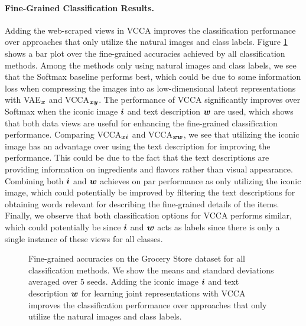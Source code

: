 \vspace{-3mm}
\paragraph{Fine-Grained Classification Results.} Adding the web-scraped views in VCCA improves the classification performance over approaches that only utilize the natural images and class labels. Figure \ref{fig:fine_grained_classification_results} shows a bar plot over the fine-grained accuracies achieved by all classification methods. Among the methods only using natural images and class labels, we see that the Softmax baseline performs best, which could be due to some information loss when compressing the images into as low-dimensional latent representations with VAE$_{{\bm{x}}}$ and VCCA$_{{\bm{x}} {\bm{y}}}$. The performance of VCCA significantly improves over Softmax when the iconic image ${\bm{i}}$ and text description ${\bm{w}}$ are used, which shows that both data views are useful for enhancing the fine-grained classification performance. Comparing VCCA$_{{\bm{x}} {\bm{i}}}$ and VCCA$_{{\bm{x}} {\bm{w}}}$, we see that utilizing the iconic image has an advantage over using the text description for improving the performance. This could be due to the fact that the text descriptions are providing information on ingredients and flavors rather than visual appearance. Combining both ${\bm{i}}$ and ${\bm{w}}$ achieves on par performance as only utilizing the iconic image, which could potentially be improved by filtering the text descriptions for obtaining words relevant for describing the fine-grained details of the items. Finally, we observe that both classification options for VCCA performs similar, which could potentially be since ${\bm{i}}$ and ${\bm{w}}$ acts as labels since there is only a single instance of these views for all classes.  

\begin{figure}[t]
	\centering
	\setlength{\figwidth}{0.62\textwidth}
	\setlength{\figheight}{.22\textheight}
	
	\vspace{-2mm}
	\caption{Fine-grained accuracies on the Grocery Store dataset for all classification methods. We show the means and standard deviations averaged over 5 seeds. Adding the iconic image ${\bm{i}}$ and text description ${\bm{w}}$ for learning joint representations with VCCA improves the classification performance over approaches that only utilize the natural images and class labels.}
	\label{fig:fine_grained_classification_results}
	\vspace{-3mm}
\end{figure}


